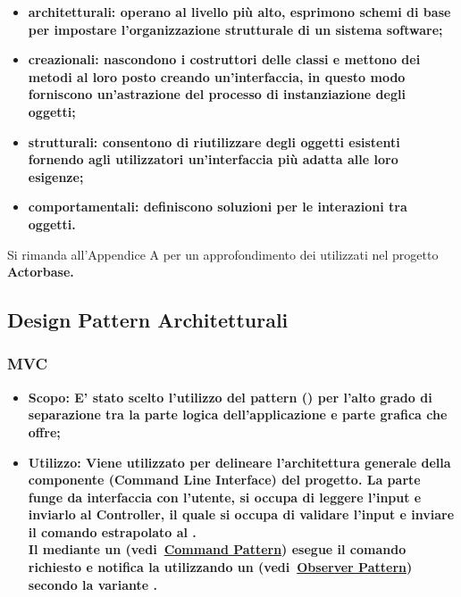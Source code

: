 \documentclass{scalatekids-article}
\begin{document}
\begin{itemize}
\item \bf{architetturali:} operano al livello più alto,
  esprimono schemi di base per impostare l'organizzazione strutturale di un
  sistema software;
\item \bf{creazionali:} nascondono i costruttori delle classi e mettono dei
  metodi al loro posto creando un'interfaccia, in questo modo forniscono
  un'astrazione del processo di instanziazione degli oggetti;
\item \bf{strutturali:} consentono di riutilizzare degli oggetti esistenti
  fornendo agli utilizzatori un'interfaccia più adatta alle loro esigenze;
\item \bf{comportamentali:} definiscono soluzioni per le interazioni tra
  oggetti.
\end{itemize}

Si rimanda all'Appendice A per un approfondimento dei 
utilizzati nel progetto \bf{Actorbase}.

\subsection{Design Pattern Architetturali}

\subsubsection{MVC}

\begin{itemize}
\item \bf{Scopo:} E' stato scelto l'utilizzo del pattern 
    () per l'alto grado di separazione
  tra la parte logica dell'applicazione e parte grafica che offre;
\item \bf{Utilizzo:} Viene utilizzato per delineare l'architettura generale
  della componente  (Command Line Interface) del progetto. La parte
   funge da interfaccia con l'utente, si occupa di leggere l'input e
  inviarlo al Controller, il quale si occupa di validare l'input
  e inviare il comando estrapolato al .\\
  Il  mediante un  (vedi~\hyperref[sec:CommandPattern]{Command Pattern})
  esegue il comando richiesto e notifica la  utilizzando un 
  (vedi~\hyperref[sec:ObserverPattern]{Observer Pattern}) secondo la variante .
\end{itemize}
\end{document}
